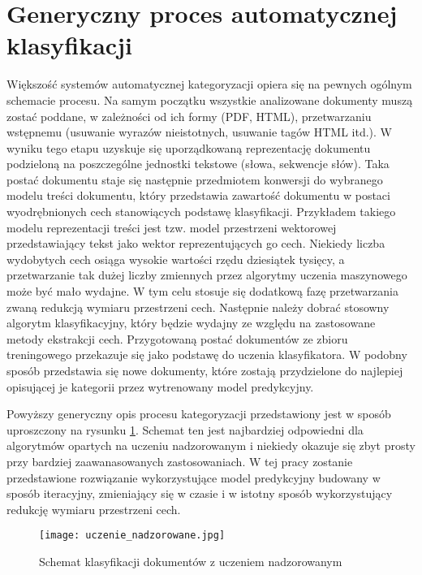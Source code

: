 \documentclass{pracamgr}
\begin{document}
\section{Generyczny proces automatycznej klasyfikacji}

Większość systemów automatycznej kategoryzacji opiera się na pewnych ogólnym schemacie procesu. Na samym początku wszystkie analizowane dokumenty muszą zostać poddane, w zależności od ich formy (PDF, HTML), przetwarzaniu wstępnemu (usuwanie wyrazów nieistotnych, usuwanie tagów HTML itd.). W wyniku tego etapu uzyskuje się uporządkowaną reprezentację dokumentu podzieloną na poszczególne jednostki tekstowe (słowa, sekwencje słów). Taka postać dokumentu staje się następnie przedmiotem konwersji do wybranego modelu treści dokumentu, który przedstawia zawartość dokumentu w postaci wyodrębnionych cech stanowiących podstawę klasyfikacji. Przykładem takiego modelu reprezentacji treści jest tzw. model przestrzeni wektorowej przedstawiający tekst jako wektor reprezentujących go cech. Niekiedy liczba wydobytych cech osiąga wysokie wartości rzędu dziesiątek tysięcy, a przetwarzanie tak dużej liczby zmiennych przez algorytmy uczenia maszynowego może być mało wydajne. W tym celu stosuje się dodatkową fazę przetwarzania zwaną redukcją wymiaru przestrzeni cech. Następnie należy dobrać stosowny algorytm klasyfikacyjny, który będzie wydajny ze względu na zastosowane metody ekstrakcji cech. Przygotowaną postać dokumentów ze zbioru treningowego przekazuje się jako podstawę do uczenia klasyfikatora. W podobny sposób przedstawia się nowe dokumenty, które zostają przydzielone do najlepiej opisującej je kategorii przez wytrenowany model predykcyjny.

Powyższy generyczny opis procesu kategoryzacji przedstawiony jest w sposób uproszczony na rysunku \ref{fig:supervised}. Schemat ten jest najbardziej odpowiedni dla algorytmów opartych na uczeniu nadzorowanym i niekiedy okazuje się zbyt prosty przy bardziej zaawanasowanych zastosowaniach. W tej pracy zostanie przedstawione rozwiązanie wykorzystujące model predykcyjny budowany w sposób iteracyjny, zmieniający się w czasie i w istotny sposób wykorzystujący redukcję wymiaru przestrzeni cech.

\begin{figure}[H]
    \centering
    \texttt{[image: uczenie\_nadzorowane.jpg]}
    \caption{Schemat klasyfikacji dokumentów z uczeniem nadzorowanym}
    \label{fig:supervised}
\end{figure}
\end{document}
